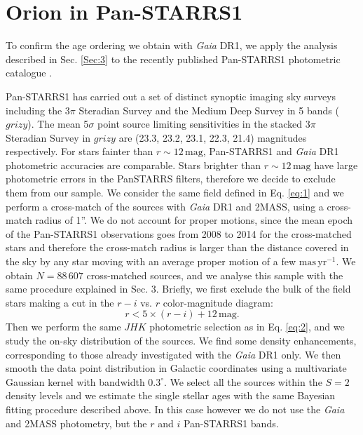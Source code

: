 \documentclass[onecolumn]{aa} %
\begin{document}
\section{Orion in Pan-STARRS1} 
To confirm the age ordering we obtain with \textit{Gaia} DR1,  we apply the analysis described in Sec. \ref{Sec:3} to the recently published Pan-STARRS1 photometric catalogue \citep{Chambers2016,Magnier2016}.

Pan-STARRS1 has carried out a set of distinct synoptic imaging sky surveys including the $3\pi$ Steradian Survey and the Medium Deep Survey in 5 bands ($grizy$). The mean 5$\sigma$ point source limiting sensitivities in the stacked 3$\pi$ Steradian Survey in $grizy$ are (23.3, 23.2, 23.1, 22.3, 21.4) magnitudes respectively. For stars fainter than $r \sim 12 \, \mathrm{mag}$, Pan-STARRS1 and \textit{Gaia} DR1 photometric accuracies are comparable. Stars brighter than $r \sim 12 \, \mathrm{mag}$ have large photometric errors in the PanSTARRS filters, therefore we decide to exclude them from our sample. 
We consider the same field defined in Eq. \eqref{eq:1} and we perform a cross-match of the sources with \textit{Gaia} DR1 and 2MASS, using a cross-match radius of 1''. We do not account for proper motions, since the mean epoch of the Pan-STARRS1 observations goes from 2008 to 2014 for the cross-matched stars and therefore the cross-match radius is larger than the distance covered in the sky by any star moving with an average proper motion of a few $\mathrm{mas \, yr^{-1}}$.
We obtain $N = 88 \, 607$ cross-matched sources, and we analyse this sample with the same procedure explained in Sec. 3. Briefly, we first exclude the bulk of the field stars making a cut in the $r-i$ vs. $r$ color-magnitude diagram:
\begin{equation}
r <  5 \times (r-i)+ 12 \, \mathrm{mag}.
\end{equation}
Then we perform the same $JHK$ photometric selection as in Eq. \ref{eq:2}, and we study the on-sky distribution of the sources. We find some density enhancements, corresponding to those already investigated with the \textit{Gaia} DR1 only. We then smooth
the data point distribution in Galactic coordinates using a multivariate Gaussian kernel with bandwidth $0.3^{\circ}$. 
We select all the sources within the $S = 2$ density levels and we estimate the single stellar ages with the same Bayesian fitting procedure described above. 
In this case however we do not use the \textit{Gaia} and 2MASS photometry, but the $r$ and $i$ Pan-STARRS1 bands.  
\end{document}
